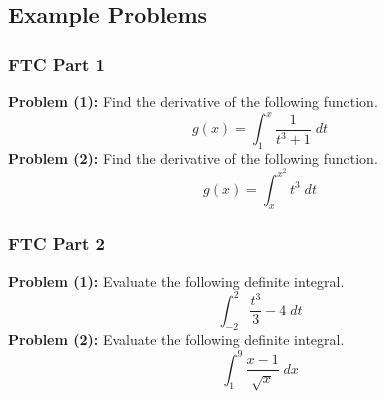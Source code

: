 \documentclass[8pt]{extarticle}
\begin{document}
\subsection{Example Problems}
\subsubsection{FTC Part 1}
\textbf{Problem (1):} Find the derivative of the following function.
$$
g(x) = \int_1^x \frac{1}{t^3 + 1}\;dt
$$
\textbf{Problem (2):} Find the derivative of the following function.
$$
g(x) = \int_x^{x^2} t^3 \;dt
$$
\subsubsection{FTC Part 2}
\textbf{Problem (1):} Evaluate the following definite integral.
$$
\int_{-2}^2 \frac{t^3}{3} - 4 \;dt 
$$
\textbf{Problem (2):} Evaluate the following definite integral.
$$
\int_{1}^9 \frac{x-1}{\sqrt{x}}\;dx
$$
\end{document}
